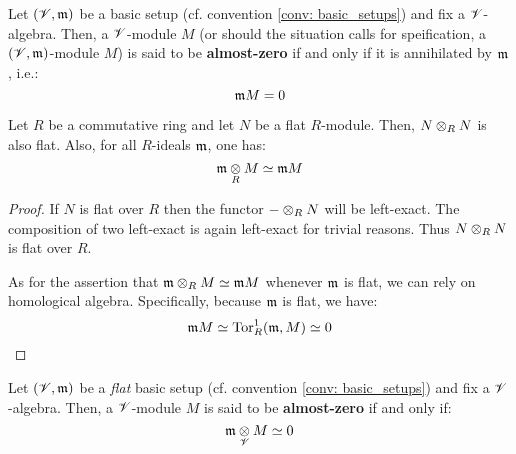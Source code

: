                     \begin{definition} \label{def: almost_zero_modules}
                        Let $(\mathscr{V}, \mathfrak{m})$ be a basic setup (cf. convention \ref{conv: basic_setups}) and fix a $\mathscr{V}$-algebra. Then, a $\mathscr{V}$-module $M$ (or should the situation calls for speification, a $(\mathscr{V}, \mathfrak{m})$-module $M$) is said to be \textbf{almost-zero} if and only if it is annihilated by $\mathfrak{m}$, i.e.:
                            $$\mathfrak{m} M = 0$$
                    \end{definition}
                    \begin{lemma} \label{lemma: tensor_powers_of_flat_modules}
                        Let $R$ be a commutative ring and let $N$ be a flat $R$-module. Then, $N \tensor_R N$ is also flat. Also, for all $R$-ideals $\mathfrak{m}$, one has:
                            $$\m \tensor_R M \cong \m M$$
                    \end{lemma}
                        \begin{proof}
                            If $N$ is flat over $R$ then the functor $- \tensor_R N$ will be left-exact. The composition of two left-exact is again left-exact for trivial reasons. Thus $N \tensor_R N$ is flat over $R$.
                            
                            As for the assertion that $\m \tensor_R M \cong \m M$ whenever $\mathfrak{m}$ is flat, we can rely on homological algebra. Specifically, because $\mathfrak{m}$ is flat, we have:
                                $$\mathfrak{m} M \simeq \mathrm{Tor}_R^1(\mathfrak{m}, M) \simeq 0$$
                        \end{proof}
                    \begin{proposition} \label{prop: almost_zero_module_alt_def}
                        Let $(\mathscr{V}, \mathfrak{m})$ be a \textit{flat} basic setup (cf. convention \ref{conv: basic_setups}) and fix a $\mathscr{V}$-algebra. Then, a $\mathscr{V}$-module $M$ is said to be \textbf{almost-zero} if and only if:
                            $$\m \tensor_{\scrV} M  \cong0$$
                    \end{proposition}
